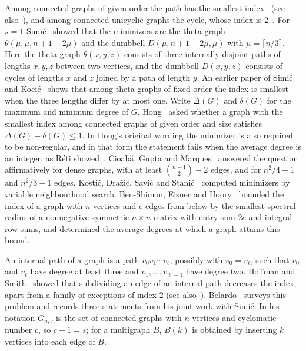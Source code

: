 \documentclass[11pt]{article}
\theoremstyle{definition}
\theoremstyle{remark}
\begin{document}
Among connected graphs of given order the path has the smallest index~\cite{CS57} (see also~\cite[Theorem~1]{Be19}),
and among connected unicyclic graphs the cycle, whose index is $2$~\cite[p.~97]{Be19}. For $s=1$ Simi\'c~\cite{Si89} showed that the minimizers are the theta graph
$\theta(\mu,\mu,n+1-2\mu)$ and the dumbbell $D(\mu,n+1-2\mu,\mu)$ with $\mu=\lceil n/3\rceil$. Here the theta graph
$\theta(x,y,z)$ consists of three internally disjoint paths of lengths $x,y,z$ between two vertices, and the dumbbell
$D(x,y,z)$ consists of cycles of lengths $x$ and $z$ joined by a path of length $y$. An earlier paper of Simi\'c and
Koci\'c~\cite{SK86} shows that among theta graphs of fixed order the index is smallest when the three lengths differ by
at most one. Write $\Delta(G)$ and $\delta(G)$ for the maximum and minimum degree of $G$. Hong~\cite{Ho93} asked whether
a graph with the smallest index among connected graphs of given order and size satisfies $\Delta(G)-\delta(G)\le1$. In
Hong's original wording the minimizer is also required to be non-regular, and in that form the statement fails when the
average degree is an integer, as R\'eti showed~\cite{Re18}. Cioab\u{a}, Gupta and Marques~\cite{CGM24} answered the
question affirmatively for dense graphs, with at least $\binom{n-1}{2}-2$ edges, and for $n^2/4-1$ and $n^2/3-1$
edges. Kosti\'c, Dra\v{z}i\'c, Savi\'c and Stani\'c~\cite{KDSS} computed minimizers by variable neighbourhood search.
Ben-Shimon, Eisner and Hoory~\cite{BEH} bounded the index of a graph with $n$ vertices and $e$ edges from below by the
smallest spectral radius of a nonnegative symmetric $n\times n$ matrix with entry sum $2e$ and integral row sums, and
determined the average degrees at which a graph attains this bound.

An internal path of a graph is a path $v_0v_1\cdots v_\ell$, possibly with $v_0=v_\ell$, such that $v_0$ and $v_\ell$
have degree at least three and $v_1,\dots,v_{\ell-1}$ have degree two. Hoffman and Smith~\cite{HS75} showed that
subdividing an edge of an internal path decreases the index, apart from a family of exceptions of index $2$ (see
also~\cite[Lemma~2]{Be19}). Belardo~\cite{Be19} surveys this problem and records three statements from his joint work
with Simi\'c. In his notation $G_{n,c}$ is the set of connected graphs with $n$ vertices and cyclomatic number $c$, so
$c-1=s$; for a multigraph $B$, $B(k)$ is obtained by inserting $k$ vertices into each edge of $B$.
\end{document}
